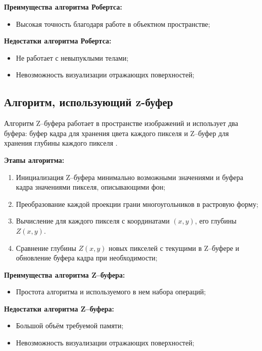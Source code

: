 \textbf{Преимущества алгоритма Робертса:}
\begin{itemize}
	\item Высокая точность благодаря работе в объектном пространстве;
\end{itemize}

\textbf{Недостатки алгоритма Робертса:}
\begin{itemize}
	\item Не работает с невыпуклыми телами;
	\item Невозможность визуализации отражающих поверхностей;
\end{itemize}


\subsection{Алгоритм, использующий z-буфер}
Алгоритм Z--буфера работает в пространстве изображений и использует два буфера: буфер кадра для хранения цвета каждого
пикселя и Z--буфер для хранения глубины каждого пикселя \cite{shikinStCG}.

\textbf{Этапы алгоритма:}
\begin{enumerate}[label=\arabic*)]
	\item Инициализация Z--буфера минимально возможными значениями и буфера кадра значениями пикселя, описывающими фон;
	\item Преобразование каждой проекции грани многоугольников в растровую форму;
	\item Вычисление для каждого пикселя с координатами $(x, y)$, его глубины $Z(x, y)$.
	\item Сравнение глубины $Z(x, y)$ новых пикселей с текущими в Z--буфере и обновление буфера кадра при необходимости;
\end{enumerate}

\textbf{Преимущества алгоритма Z--буфера:}
\begin{itemize}
	\item Простота алгоритма и используемого в нем набора операций;
\end{itemize}

\textbf{Недостатки алгоритма Z--буфера:}
\begin{itemize}
	\item Большой объём требуемой памяти;
	\item Невозможность визуализации отражающих поверхностей;
\end{itemize}

